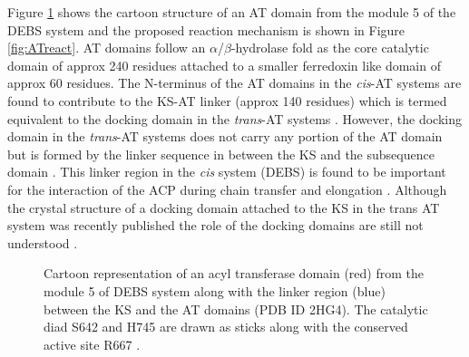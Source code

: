 			Figure \ref{fig:AT} shows the cartoon structure of an AT domain from the module 5 of the DEBS system and the proposed reaction mechanism is shown in Figure \ref{fig:ATreact}. AT domains follow  an $\alpha$/$\beta$-hydrolase fold as the core catalytic domain of approx 240 residues attached to a smaller ferredoxin like  domain of approx 60 residues. The N-terminus of the AT domains in the \textit{cis}-AT systems are found to contribute to the KS-AT linker (approx 140 residues) which is termed equivalent to the docking domain in the \textit{trans}-AT systems \parencite{Tang2006, Gay2014}. However, the docking domain in the \textit{trans}-AT systems does not carry any portion of the AT domain but is formed by the linker sequence in between the KS and the subsequence domain \parencite{Gay2014}. This linker region in the \textit{cis} system (DEBS) is found to be important for the interaction of the ACP during chain transfer and elongation \parencite{Kapur2010, Kapur2012}. Although the crystal structure of a docking domain attached to the KS in the trans AT system was recently published the role of the docking domains are still not understood \parencite{Gay2014}. 
			
			\setlength\fboxsep{5pt}
			\setlength\fboxrule{1.5pt}
			\begin{figure} []
			\centering
			\caption[Cartoon representation of an acyl transferase domain from the module 5 of DEBS system]{Cartoon representation of an acyl transferase domain (red) from the module 5 of DEBS system along with the linker region (blue) between the KS and the AT domains (PDB ID 2HG4). The catalytic diad S642 and H745 are drawn as sticks along with the conserved active site R667 \parencite{Tang2006}. }
			\label{fig:AT}
			\end{figure}			
			
